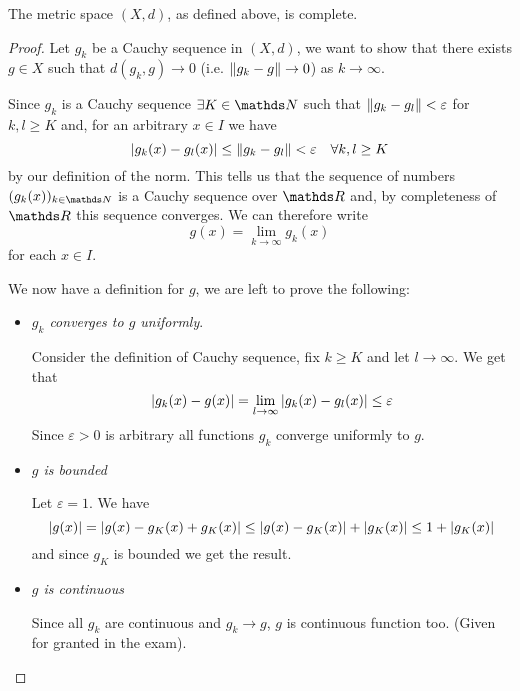 \documentclass[12pt]{extarticle}
\numberwithin{equation}{section}
\begin{document}
\begin{theorem}{}{}
    The metric space $(X, d)$, as defined above, is complete.
\end{theorem}
\begin{proof}
    Let $g_k$ be a Cauchy sequence in $(X, d)$,
    we want to show that there exists $g \in X$ such that $d(g_k, g) \to 0$ (i.e. $\norm{g_k - g} \to 0$) as $k \to \infty$.

    Since $g_k$ is a Cauchy sequence $\exists K \in \N$ such that $\norm{g_k - g_l} < \varepsilon$ for $k, l \geq K$ and, for an arbitrary $x \in I$ we have
    \begin{equation}
        \abs{g_k(x)-g_l(x)} \leq \norm{g_k - g_l} < \varepsilon \quad \forall k, l \geq K
    \end{equation}
    by our definition of the norm.
    This tells us that the sequence of numbers $(g_k(x))_{k \in \N}$ is a Cauchy sequence over $\R$ and, by completeness of $\R$ this sequence converges.
    We can therefore write
    \begin{equation}
        g(x) = \lim_{k \to \infty} g_k(x)
    \end{equation}
    for each $x \in I$.

    We now have a definition for $g$, we are left to prove the following:
    \begin{itemize}
        \item \emph{$g_k$ converges to $g$ uniformly}.

              Consider the definition of Cauchy sequence, fix $k \geq K$ and let $l \to \infty$.
              We get that
              \begin{equation}
                  \abs{g_k(x) - g(x)} = \lim_{l \to \infty} \abs{g_k(x) - g_l(x)} \leq \varepsilon
              \end{equation}
              Since $\varepsilon > 0$ is arbitrary all functions $g_k$ converge uniformly to $g$.

        \item \emph{$g$ is bounded}

              Let $\varepsilon = 1$.
              We have
              \begin{equation}
                  \abs{g(x)} = \abs{g(x) - g_K(x) + g_K(x)} \leq \abs{g(x) - g_K(x)} + \abs{g_K(x)} \leq 1 + \abs{g_K(x)}
              \end{equation}
              and since $g_K$ is bounded we get the result.

        \item \emph{$g$ is continuous}

              Since all $g_k$ are continuous and $g_k \to g$, $g$ is continuous function too.
              (Given for granted in the exam).
    \end{itemize}
\end{proof}
\end{document}
